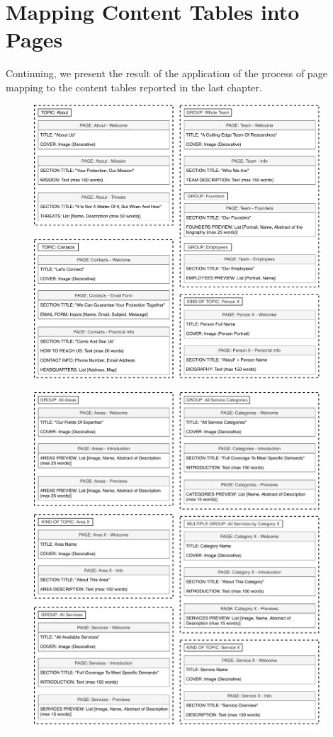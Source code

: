 \documentclass[12pt]{report}
\begin{document}
\chapter{Mapping Content Tables into Pages}
Continuing, we present the result of the application of the process of page mapping 
to the content tables reported in the last chapter.
\begin{figure}[h]
	\centering
	\includegraphics[width=0.95\textwidth]{page_mapping_pt1.pdf}
\end{figure}
\begin{figure}[h]
	\centering
	\includegraphics[width=0.95\textwidth]{page_mapping_pt2.pdf}
\end{figure}
\end{document}
